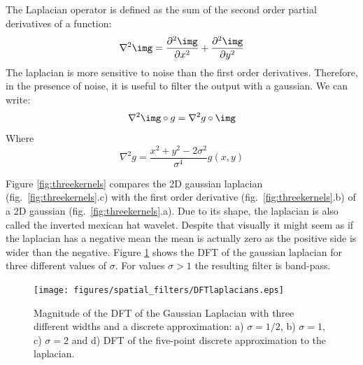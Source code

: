The Laplacian operator is defined as the sum of the second order partial derivatives of a function:
\begin{equation}
\nabla^2 \img = \frac{\partial^2 \img}{\partial x^2} + \frac{\partial^2 \img}{\partial y^2} 
\end{equation}
The laplacian is more sensitive to noise than the first order derivatives. Therefore, in the presence of noise, it is useful to filter the output with a gaussian. We can write:
\begin{equation}
\nabla^2 \img \circ g = \nabla^2 g \circ \img
\end{equation}
Where
\begin{equation}
\nabla^2 g = \frac{x^2 + y^2 -2\sigma^2}{\sigma^4} g(x,y) 
\end{equation}

Figure \ref{fig:threekernels} compares the 2D gaussian laplacian (fig.~\ref{fig:threekernels}.c) with the first order derivative (fig.~\ref{fig:threekernels}.b) of a 2D gaussian (fig.~\ref{fig:threekernels}.a). Due to its shape, the laplacian is also called the inverted mexican hat wavelet. Despite that visually it might seem as if the laplacian has a negative mean the mean is actually zero as the positive side is wider than the negative. Figure \ref{fig:DFTlaplacians} shows the DFT of the gaussian laplacian for three different values of $\sigma$. For values $\sigma>1$ the resulting filter is band-pass. 

\begin{figure}
\centerline{
\texttt{[image: figures/spatial\_filters/DFTlaplacians.eps]}}
\caption{Magnitude of the DFT of the Gaussian Laplacian with three different widths and a discrete approximation: a) $\sigma=1/2$, b) $\sigma=1$, c) $\sigma=2$ and d) DFT of the five-point discrete approximation to the laplacian.
} 
\label{fig:DFTlaplacians}
\end{figure}

